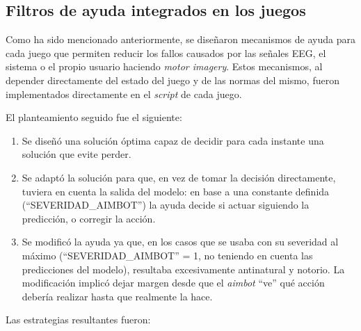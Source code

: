 \subsection{Filtros de ayuda integrados en los juegos}
\label{subsec:filtros_ayuda}

Como ha sido mencionado anteriormente, se diseñaron mecanismos de ayuda para cada juego que permiten reducir los fallos causados por las señales EEG, el sistema o el propio usuario haciendo \textit{motor imagery}. Estos mecanismos, al depender directamente del estado del juego y de las normas del mismo, fueron implementados directamente en el \textit{script} de cada juego. 

El planteamiento seguido fue el siguiente:

\begin{enumerate}
    \item Se diseñó una solución óptima capaz de decidir para cada instante una solución que evite perder.
    \item Se adaptó la solución para que, en vez de tomar la decisión directamente, tuviera en cuenta la salida del modelo: en base a una constante definida (``SEVERIDAD\_AIMBOT'') la ayuda decide si actuar siguiendo la predicción, o corregir la acción.
    \item Se modificó la ayuda ya que, en los casos que se usaba con su severidad al máximo (``SEVERIDAD\_AIMBOT'' = 1, no teniendo en cuenta las predicciones del modelo), resultaba excesivamente antinatural y notorio. La modificación implicó dejar margen desde que el \textit{aimbot} ``ve'' qué acción debería realizar hasta que realmente la hace. 
\end{enumerate}

Las estrategias resultantes fueron:


